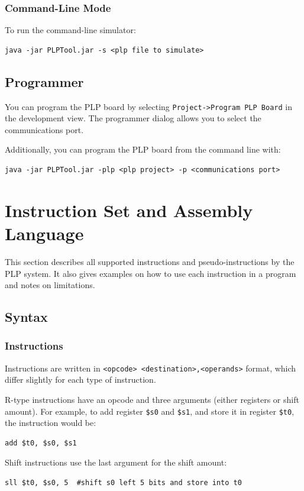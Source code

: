 \documentclass{article}
\begin{document}
\subsubsection{Command-Line Mode}
To run the command-line simulator:

\begin{verbatim}
java -jar PLPTool.jar -s <plp file to simulate>
\end{verbatim}
\subsection{Programmer}
You can program the PLP board by selecting 
\verb+Project->Program PLP Board+ 
in the development view. The programmer dialog allows you to select the 
communications port.

Additionally, you can program the PLP board from the command line with:

\begin{verbatim}
java -jar PLPTool.jar -plp <plp project> -p <communications port>
\end{verbatim}
\section{Instruction Set and Assembly Language}
This section describes all supported instructions and pseudo-instructions by the PLP system. It also gives examples on how to use each instruction in a program and notes on limitations. 
\subsection{Syntax}
\subsubsection{Instructions}
Instructions are written in 
\verb+<opcode> <destination>,<operands>+
format, which differ slightly for each type of instruction.

R-type instructions have an opcode and three arguments (either registers or shift amount). For example, to add register 
\verb+$s0+ and \verb+$s1+, 
and store it in register \verb+$t0+, the instruction would be:

\begin{verbatim}
add $t0, $s0, $s1
\end{verbatim}

Shift instructions use the last argument for the shift amount:

\begin{verbatim}
sll $t0, $s0, 5  #shift s0 left 5 bits and store into t0
\end{verbatim}
\end{document}
